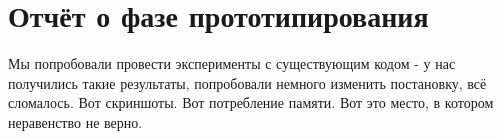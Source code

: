 \documentclass[]{scrartcl}
\begin{document}
\section{Отчёт о фазе прототипирования}
Мы попробовали провести эксперименты с существующим кодом - у нас получились такие результаты, попробовали немного изменить постановку, всё сломалось. Вот скриншоты. Вот потребление памяти. Вот это место, в котором неравенство не верно.



\end{document}
